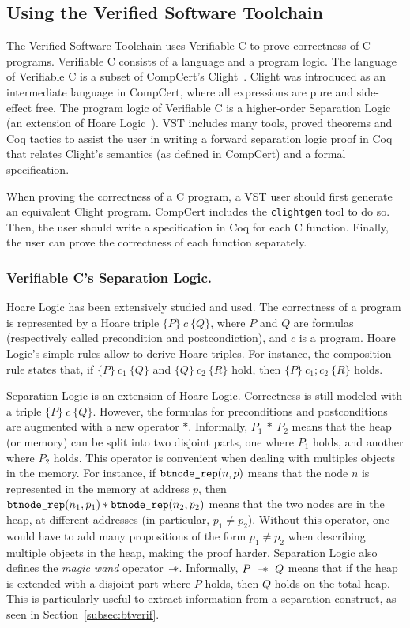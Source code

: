 \subsection{Using the Verified Software Toolchain}
The Verified Software Toolchain uses Verifiable C to prove correctness of C programs.
Verifiable C consists of a language and a program logic.
The language of Verifiable C is a subset of CompCert's Clight~\cite{clight}.
Clight was introduced as an intermediate language in CompCert, where all expressions are pure and side-effect free.
The program logic of Verifiable C is a higher-order Separation Logic~\cite{sep} (an extension of Hoare Logic~\cite{hoare}).
VST includes many tools, proved theorems and Coq tactics to assist the user in writing a forward separation logic proof in Coq that relates Clight's semantics (as defined in CompCert) and a formal specification.

When proving the correctness of a C program, a VST user should first generate an equivalent Clight program.
CompCert includes the \texttt{clightgen} tool to do so. Then, the user should write a specification in Coq for each C function.
Finally, the user can prove the correctness of each function separately.

\subsubsection{Verifiable C's Separation Logic.}
Hoare Logic has been extensively studied and used.
The correctness of a program is represented by a Hoare triple $\{P\}~c~\{Q\}$, where $P$ and $Q$ are formulas (respectively called precondition and postcondiction), and $c$ is a program.
Hoare Logic's simple rules allow to derive Hoare triples. For instance, the composition rule states that, if $\{P\}~c_1~\{Q\}$ and $\{Q\}~c_2~\{R\}$ hold, then $\{P\}~c_1;c_2~\{R\}$ holds.

Separation Logic is an extension of Hoare Logic. Correctness is still modeled with a triple $\{P\}~c~\{Q\}$. However, the formulas for preconditions and postconditions are augmented with a new operator $*$.
Informally, $P_1~*~P_2$ means that the heap (or memory) can be split into two disjoint parts, one where $P_1$ holds, and another where $P_2$ holds.
This operator is convenient when dealing with multiples objects in the memory.
For instance, if $\texttt{btnode\_rep}(n,p)$ means that the node $n$ is represented in the memory at address $p$, then $\texttt{btnode\_rep}(n_1,p_1)*\texttt{btnode\_rep}(n_2,p_2)$ means that the two nodes are in the heap, at different addresses (in particular, $p_1\neq p_2$).
Without this operator, one would have to add many propositions of the form $p_1\neq p_2$ when describing multiple objects in the heap, making the proof harder.
Separation Logic also defines the \textit{magic wand} operator $\mathrel{-\hspace{-.7ex}*}$. Informally, $P~\mathrel{-\hspace{-.7ex}*}~Q$ means that if the heap is extended with a disjoint part where $P$ holds, then $Q$ holds on the total heap.
This is particularly useful to extract information from a separation construct, as seen in Section~\ref{subsec:btverif}.

